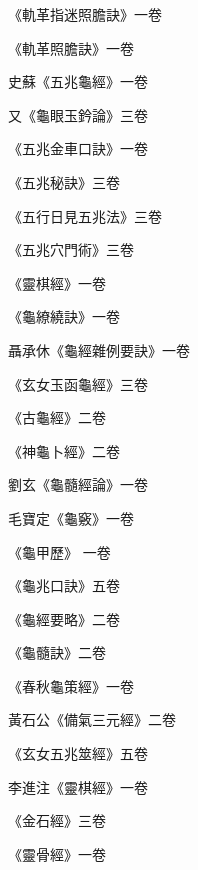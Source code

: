 \begin{pinyinscope}
 《軌革指迷照膽訣》一卷



 《軌革照膽訣》一卷



 史蘇《五兆龜經》一卷



 又《龜眼玉鈐論》三卷



 《五兆金車口訣》一卷



 《五兆秘訣》三卷



 《五行日見五兆法》三卷



 《五兆穴門術》三卷



 《靈棋經》一卷



 《龜繚繞訣》一卷



 聶承休《龜經雜例要訣》一卷



 《玄女玉函龜經》三卷



 《古龜經》二卷



 《神龜卜經》二卷



 劉玄《龜髓經論》一卷



 毛寶定《龜竅》一卷



 《龜甲歷》
 一卷



 《龜兆口訣》五卷



 《龜經要略》二卷



 《龜髓訣》二卷



 《春秋龜策經》一卷



 黃石公《備氣三元經》二卷



 《玄女五兆筮經》五卷



 李進注《靈棋經》一卷



 《金石經》三卷



 《靈骨經》一卷




\end{pinyinscope}
